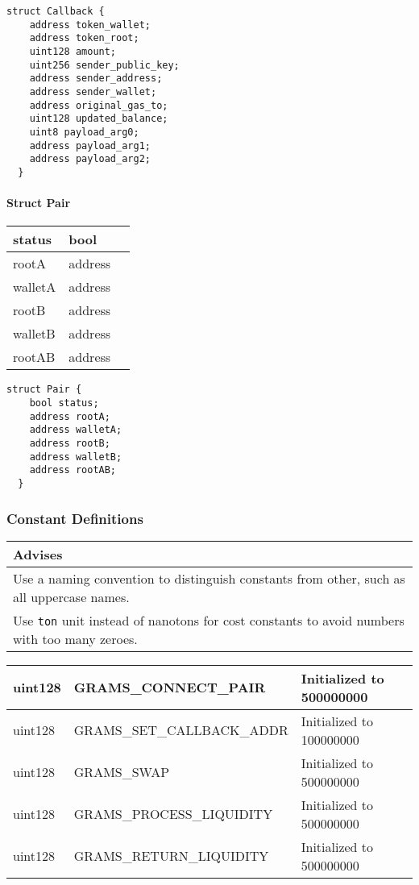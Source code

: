 \begin{lstlisting}[firstnumber=43]
  struct Callback {
    address token_wallet;
    address token_root;
    uint128 amount;
    uint256 sender_public_key;
    address sender_address;
    address sender_wallet;
    address original_gas_to;
    uint128 updated_balance;
    uint8 payload_arg0;
    address payload_arg1;
    address payload_arg2;
  }
\end{lstlisting}

\paragraph{Struct Pair}


\ifsoltables
\noindent\begin{tabular}{|l|l|p{6cm}|}\hline
status & bool & \\\hline
rootA & address & \\\hline
walletA & address & \\\hline
rootB & address & \\\hline
walletB & address & \\\hline
rootAB & address & \\\hline
\end{tabular}
\fi


\begin{lstlisting}[firstnumber=60]
  struct Pair {
    bool status;
    address rootA;
    address walletA;
    address rootB;
    address walletB;
    address rootAB;
  }
\end{lstlisting}

\subsubsection{Constant Definitions}


\ifsoldraft
\noindent\begin{tabular}{|p{12cm}|}\hline
\rowcolor{green}Advises
\\\hline
Use a naming convention to distinguish constants from other, such as all uppercase names.
\\\hline
Use \verb+ton+ unit instead of nanotons for cost constants to avoid numbers with too many zeroes.
\\\hline\end{tabular}
\fi

\ifsoltables
\noindent\begin{tabular}{|l|l|p{5cm}|}\hline
uint128 & GRAMS\_{}CONNECT\_{}PAIR & Initialized to 500000000  \\\hline
uint128 & GRAMS\_{}SET\_{}CALLBACK\_{}ADDR & Initialized to 100000000  \\\hline
uint128 & GRAMS\_{}SWAP & Initialized to 500000000  \\\hline
uint128 & GRAMS\_{}PROCESS\_{}LIQUIDITY & Initialized to 500000000  \\\hline
uint128 & GRAMS\_{}RETURN\_{}LIQUIDITY & Initialized to 500000000  \\\hline
\end{tabular}
\fi



